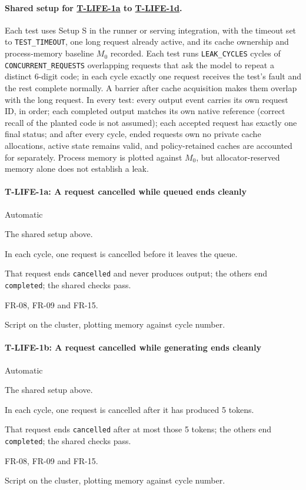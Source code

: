 \documentclass[12pt, titlepage]{article}
\newenvironment{testcase}[2]
  {\Needspace{8\baselineskip}\paragraph{#1: #2}\phantomsection\label{test:#1}\sloppy
   \begin{description}[style=sameline, leftmargin=3.6cm, labelwidth=3.4cm,
     font=\normalfont\bfseries, itemsep=2pt, topsep=2pt]}
  {\end{description}}
\newcommand{\cst}[1]{\texttt{#1}}
\newcommand{\tref}[1]{\hyperref[test:#1]{#1}}
\begin{document}
\paragraph{Shared setup for \tref{T-LIFE-1a} to \tref{T-LIFE-1d}.} Each
test uses Setup S in the runner or serving integration, with the timeout set
to \cst{TEST\_TIMEOUT}, one long request already active, and its cache
ownership and process-memory baseline $M_0$ recorded. Each test runs
\cst{LEAK\_CYCLES} cycles of \cst{CONCURRENT\_REQUESTS} overlapping requests
that ask the model to repeat a distinct 6-digit code; in each cycle exactly
one request receives the test's fault and the rest complete normally. A
barrier after cache acquisition makes them overlap with the long request.
In every test: every output event carries its own request ID, in order;
each completed output matches its own native reference (correct recall of
the planted code is not assumed); each accepted request has exactly one
final status; and after every cycle, ended requests own no private cache
allocations, active state remains valid, and policy-retained caches are
accounted for separately. Process memory is plotted against $M_0$, but
allocator-reserved memory alone does not establish a leak.

\begin{testcase}{T-LIFE-1a}{A request cancelled while queued ends cleanly}
\item[Control] Automatic
\item[Initial state] The shared setup above.
\item[Input] In each cycle, one request is cancelled before it leaves the
queue.
\item[Output] That request ends \texttt{cancelled} and never produces
output; the others end \texttt{completed}; the shared checks pass.
\item[Derivation] FR-08, FR-09 and FR-15.
\item[How performed] Script on the cluster, plotting memory against cycle
number.
\end{testcase}

\begin{testcase}{T-LIFE-1b}{A request cancelled while generating ends
cleanly}
\item[Control] Automatic
\item[Initial state] The shared setup above.
\item[Input] In each cycle, one request is cancelled after it has produced
5 tokens.
\item[Output] That request ends \texttt{cancelled} after at most those 5
tokens; the others end \texttt{completed}; the shared checks pass.
\item[Derivation] FR-08, FR-09 and FR-15.
\item[How performed] Script on the cluster, plotting memory against cycle
number.
\end{testcase}
\end{document}
